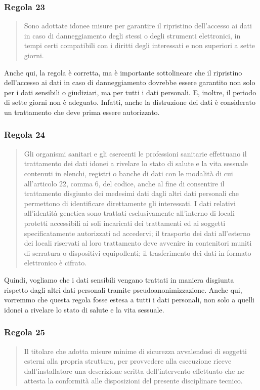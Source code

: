 \subsubsection*{Regola 23}
\begin{quote}
    Sono adottate idonee misure per garantire il ripristino dell'accesso ai dati in caso di danneggiamento degli stessi o degli strumenti elettronici, in tempi certi compatibili con i diritti degli interessati e non superiori a sette giorni.
\end{quote}
Anche qui, la regola è corretta, ma è importante sottolineare che il ripristino dell'accesso ai dati in caso di danneggiamento dovrebbe essere garantito non solo per i dati sensibili o giudiziari, ma per tutti i dati personali.
E, inoltre, il periodo di sette giorni non è adeguato.
Infatti, anche la distruzione dei dati è considerato un trattamento che deve prima essere autorizzato.
\subsubsection*{Regola 24}
\begin{quote}
    Gli organismi sanitari e gli esercenti le professioni sanitarie effettuano il trattamento dei dati idonei a rivelare lo stato di salute e la vita sessuale contenuti in elenchi, registri o banche di dati con le modalità di cui all'articolo 22, comma 6, del codice, anche al fine di consentire il trattamento disgiunto dei medesimi dati dagli altri dati personali che permettono di identificare direttamente gli interessati.
    I dati relativi all'identità genetica sono trattati esclusivamente all'interno di locali protetti accessibili ai soli incaricati dei trattamenti ed ai soggetti specificatamente autorizzati ad accedervi;
    il trasporto dei dati all'esterno dei locali riservati al loro trattamento deve avvenire in contenitori muniti di serratura o dispositivi equipollenti;
    il trasferimento dei dati in formato elettronico è cifrato.
\end{quote}

Quindi, vogliamo che i dati sensibili vengano trattati in maniera disgiunta rispetto dagli altri dati personali tramite pseudoanonimizzazione.
Anche qui, vorremmo che questa regola fosse estesa a tutti i dati personali, non solo a quelli idonei a rivelare lo stato di salute e la vita sessuale.
\subsubsection*{Regola 25}
\begin{quote}
    Il titolare che adotta misure minime di sicurezza avvalendosi di soggetti esterni alla propria struttura, per provvedere alla esecuzione riceve dall'installatore una descrizione scritta dell'intervento effettuato che ne attesta la conformità alle disposizioni del presente disciplinare tecnico.
\end{quote}

